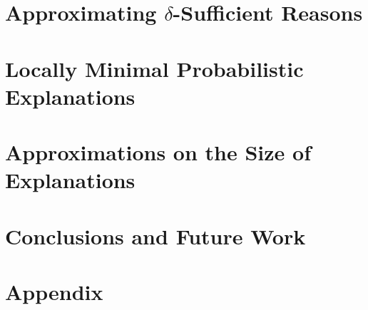 \documentclass[11pt, letterpaper]{article}
\begin{document}
\section{Approximating \texorpdfstring{$\delta$}{delta}-Sufficient Reasons}
\label{sec-comp-problem}


\section{Locally Minimal Probabilistic Explanations}
\label{sec-loc-min}


\section{Approximations on the Size of Explanations}
\label{sec-size-approx}


\section{Conclusions and Future Work}
\label{sec-conclusions}






\newpage
\onecolumn
\appendix
\section*{Appendix}

\end{document}
